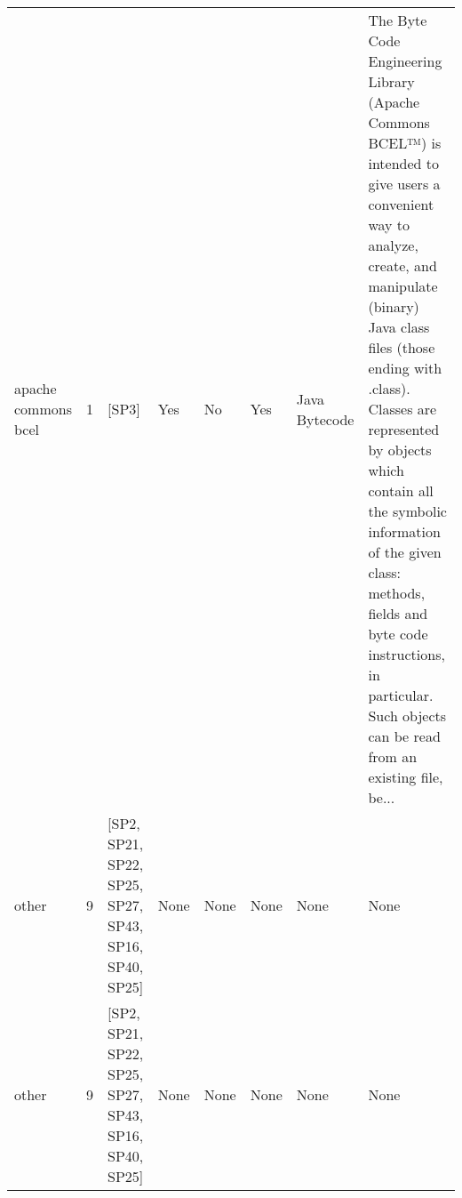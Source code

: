 \begin{tabular}{lrllllll}
 apache commons bcel &      1 &                                                  [SP3] &   Yes &       No &       Yes &                                                                                                                                                                           Java Bytecode &  The Byte Code Engineering Library (Apache Commons BCEL™) is intended to give users a convenient way to analyze, create, and manipulate (binary) Java class files (those ending with .class). Classes are represented by objects which contain all the symbolic information of the given class: methods, fields and byte code instructions, in particular. Such objects can be read from an existing file, be... \\
               other &      9 &  [SP2, SP21, SP22, SP25, SP27, SP43, SP16, SP40, SP25] &  None &     None &      None &                                                                                                                                                                                    None &                                                                                                                                                                                                                                                                                                                                                                                                             None \\
               other &      9 &  [SP2, SP21, SP22, SP25, SP27, SP43, SP16, SP40, SP25] &  None &     None &      None &                                                                                                                                                                                    None &                                                                                                                                                                                                                                                                                                                                                                                                             None \\
\bottomrule
\end{tabular}
